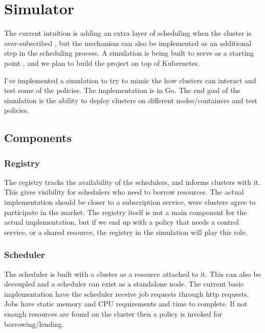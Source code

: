 \section{Simulator}
The current intuition is adding an extra layer 
of scheduling when the cluster is over-subscribed \cite{zaharia_delay_2010}, 
but the mechanism can also be implemented as an additional step in the scheduling process. 
A simulation is being built to serve as a starting point \cite{sched-github}, 
and we plan to build the project on top of Kubernetes.

I've implemented a simulation to try to mimic the how clusters can interact and test some of the policies. 
The implementation is in Go. The end goal of the simulation is the ability to deploy clusters on different 
nodes/containers and test policies.

\subsection{Components}
\subsubsection{Registry}
The registry tracks the availability of the schedulers, and informs clusters with it. 
This gives visibility for schedulers who need to borrow resources. 
The actual implementation should be closer to a subscription service, 
were clusters agree to participate in the market. The registry itself is not a main 
component for the actual implementation, but if we end up with a policy that needs a control service, 
or a shared resource, the registry in the simulation will play this role.


\subsubsection{Scheduler}
The scheduler is built with a cluster as a resource attached to it. 
This can also be decoupled and a scheduler can exist as a standalone node. 
The current basic implementation have the scheduler receive job requests through http requests. 
Jobs have static memory and CPU requirements and time to complete. If not enough resources 
are found on the cluster then a policy is invoked for borrowing/lending.